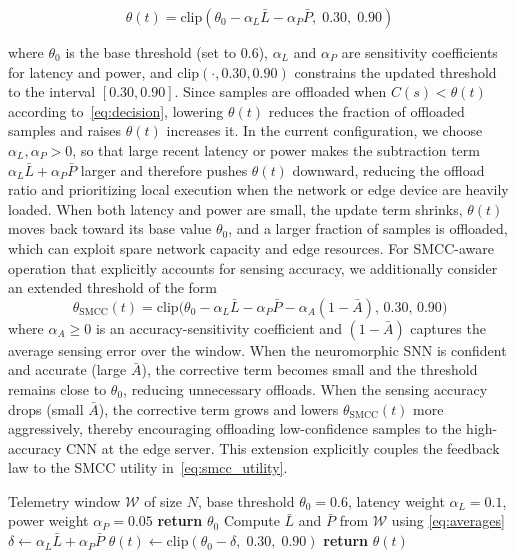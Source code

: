 \documentclass[journal]{IEEEtran}
\newcommand{\revblue}[1]{\textcolor{revblue}{#1}}
\begin{document}
\begin{equation}
\theta(t) = \mathrm{clip}\!\left(
  \theta_0 - \alpha_L \bar{L} - \alpha_P \bar{P},\; 0.30,\; 0.90
\right)
\label{eq:theta}
\end{equation}

\revblue{where $\theta_0$ is the base threshold (set to $0.6$),
$\alpha_L$ and $\alpha_P$ are sensitivity coefficients for latency and
power, and $\mathrm{clip}(\cdot,0.30,0.90)$ constrains the updated
threshold to the interval $[0.30,0.90]$. Since samples are offloaded
when $C(s) < \theta(t)$ according to~\eqref{eq:decision}, lowering
$\theta(t)$ reduces the fraction of offloaded samples and raises
$\theta(t)$ increases it. In the current configuration, we choose
$\alpha_L,\alpha_P>0$, so that large recent latency or power makes the
subtraction term $\alpha_L \bar{L} + \alpha_P \bar{P}$ larger and
therefore pushes $\theta(t)$ downward, reducing the offload ratio and
prioritizing local execution when the network or edge device are heavily
loaded. When both latency and power are small, the update term shrinks,
$\theta(t)$ moves back toward its base value $\theta_0$, and a larger
fraction of samples is offloaded, which can exploit spare network
capacity and edge resources.}
\revblue{For SMCC-aware operation that explicitly accounts for sensing
accuracy, we additionally consider an extended threshold of the form}
\revblue{
\begin{equation}
\theta_{\text{SMCC}}(t)
= \mathrm{clip}\big(
\theta_0 - \alpha_L \bar{L} - \alpha_P \bar{P}
- \alpha_A (1-\bar{A}),\,0.30,\,0.90\big)
\label{eq:theta_smcc}
\end{equation}
}
\revblue{where $\alpha_A \geq 0$ is an accuracy-sensitivity coefficient
and $(1-\bar{A})$ captures the average sensing error over the window.
When the neuromorphic SNN is confident and accurate (large $\bar{A}$),
the corrective term becomes small and the threshold remains close to
$\theta_0$, reducing unnecessary offloads. When the sensing accuracy
drops (small $\bar{A}$), the corrective term grows and lowers
$\theta_{\text{SMCC}}(t)$ more aggressively, thereby encouraging
offloading low-confidence samples to the high-accuracy CNN at the edge
server. This extension explicitly couples the feedback law to the SMCC
utility in~\eqref{eq:smcc_utility}.}



\begin{algorithm}[!t]
\caption{NSSON Adaptive Feedback Threshold Update}
\label{alg:feedback}
\begin{algorithmic}[1]
\REQUIRE Telemetry window $\mathcal{W}$ of size $N$,
         base threshold $\theta_0 = 0.6$,
         latency weight $\alpha_L = 0.1$,
         power weight $\alpha_P = 0.05$
  \STATE \textbf{return} $\theta_0$ 
\ENDIF
\STATE Compute $\bar{L}$ and $\bar{P}$ from $\mathcal{W}$ using \eqref{eq:averages}
\STATE $\delta \leftarrow \alpha_L \bar{L} + \alpha_P \bar{P}$
\STATE $\theta(t) \leftarrow \mathrm{clip}(\theta_0 - \delta,\; 0.30,\; 0.90)$
\STATE \textbf{return} $\theta(t)$
\end{algorithmic}
\end{algorithm}
\end{document}
